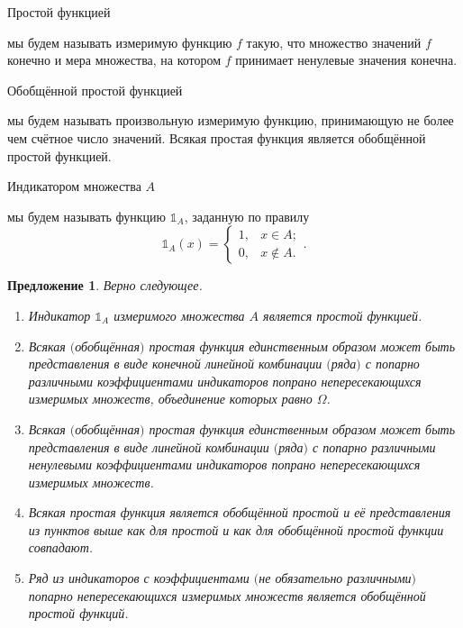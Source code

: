 \documentclass[12pt]{article}
\newtheorem{proposition}[theorem]{Предложение}
\numberwithin{theorem}{section}
\theoremstyle{definition}
\newcommand{\defin}[2]{\hypertarget{#2}{{\color{red} #1}}}
\newcommand{\ind}{\mathds{1}}
\newcommand{\definefuntwo}[4]{
	\begin{cases}
		#1, & #2; \\
		#3, & #4.
	\end{cases}
}
\begin{document}
	
	
	\defin{Простой функцией}{simple-function} мы будем называть измеримую функцию $ f $ такую, что
	множество значений $ f $ конечно и мера множества, на котором $ f $ принимает ненулевые значения конечна.
	
	\defin{Обобщённой простой функцией}{deneralized-simple-function} мы будем называть произвольную измеримую функцию, 
	принимающую не более чем счётное число значений. Всякая простая функция является обобщённой простой функцией.
	
	\defin{Индикатором множества $ A $}{indicator} мы будем называть функцию $ \ind_{A} $, заданную по правилу
	$$ \ind_A(x) = \definefuntwo{1}{x \in A}{0}{x \notin A}. $$
	
	\begin{proposition} \label{simple function description}
		Верно следующее.
		\begin{enumerate}
			\item Индикатор $ \ind_A $ измеримого множества $ A $ является простой функцией. 
			\label{simple function description | indicator}
			\item Всякая $ ( $обобщённая$ ) $ простая функция 
			единственным образом может быть представления в виде конечной линейной комбинации $ ( $ряда$ ) $
			с попарно различными коэффициентами индикаторов попрано непересекающихся измеримых множеств, 
			объединение которых равно $ \Omega $.
			\label{simple function description | decomposition}
			\item Всякая $ ( $обобщённая$ ) $ простая функция 
			единственным образом может быть представления в виде линейной комбинации
			$ ( $ряда$ ) $ с попарно различными ненулевыми коэффициентами 
			индикаторов попрано непересекающихся измеримых множеств.
			\label{simple function description | non-zero decomposition}
			\item Всякая простая функция является обобщённой простой и её представления из пунктов выше
			как для простой и как для обобщённой простой функции совпадают.
			\label{simple function description | simple and generalized simple}
			\item Ряд из индикаторов с коэффициентами $ ( $не обязательно различными$ ) $ 
			 попарно непересекающихся измеримых множеств является обобщённой простой функций.
			\label{simple function description | construction}
		\end{enumerate}
	\end{proposition}
	
\end{document}
